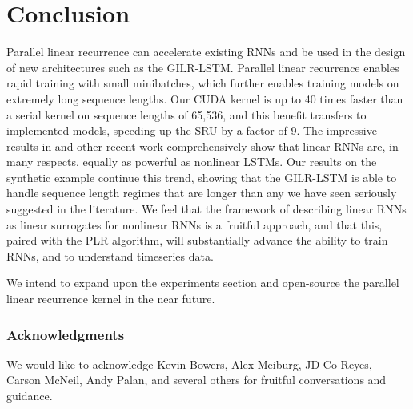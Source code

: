 \documentclass{article}
\begin{document}
\section{Conclusion}
Parallel linear recurrence can accelerate existing RNNs and be used in the design
of new architectures such as the GILR-LSTM. Parallel linear recurrence enables
rapid training with small minibatches, which further enables training models on
extremely long sequence lengths.
Our CUDA kernel is up to 40 times faster than a serial kernel on
sequence lengths of 65,536, and this benefit transfers to implemented models,
speeding up the SRU \cite{lei2017} by a factor of 9. The impressive results in
\cite{lei2017} and other recent work comprehensively show that
linear RNNs are, in many respects, equally as powerful as nonlinear
LSTMs. Our results on the synthetic example continue this trend, showing that
the GILR-LSTM is able to handle sequence length regimes that are longer than any
we have seen seriously suggested in the literature. We feel that the framework
of describing linear RNNs as linear surrogates for nonlinear RNNs is a fruitful
approach, and that this, paired with the PLR algorithm, will substantially
advance the ability to train RNNs, and to understand timeseries data.



We intend to expand upon the experiments section and open-source the parallel
linear recurrence kernel in the near future.

\subsubsection*{Acknowledgments}
We would like to acknowledge Kevin Bowers, Alex Meiburg, JD Co-Reyes, Carson
McNeil, Andy Palan, and several others for fruitful conversations and guidance.
\end{document}
